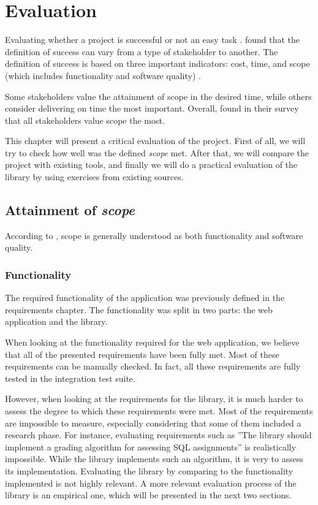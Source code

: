 \chapter{Evaluation}

Evaluating whether a project is successful or not an easy task \citep{lit:definining_success}. \cite{lit:definining_success} found that the definition of success can vary from a type of stakeholder to another. The definition of success is based on three important indicators: cost, time, and scope (which includes functionality and software quality) \citep{lit:definining_success}.

Some stakeholders value the attainment of scope in the desired time, while others consider delivering on time the most important. Overall, \cite{lit:definining_success} found in their survey that all stakeholders value scope the most.

This chapter will present a critical evaluation of the project. First of all, we will try to check how well was the defined \textit{scope} met. After that, we will compare the project with existing tools, and finally we will do a practical evaluation of the library by using exercises from existing sources.

\section{Attainment of \textit{scope}}
According to \cite{lit:definining_success}, scope is generally understood as both functionality and software quality.

\subsection{Functionality}

The required functionality of the application was previously defined in the requirements chapter. The functionality was split in two parts: the web application and the library.

When looking at the functionality required for the web application, we believe that all of the presented requirements have been fully met. Most of these requirements can be manually checked. In fact, all these requirements are fully tested in the integration test suite.

However, when looking at the requirements for the library, it is much harder to assess the degree to which these requirements were met. Most of the requirements are impossible to measure, especially considering that some of them included a research phase. For instance, evaluating requirements such as ''The library should implement a grading algorithm for assessing SQL assignments'' is realistically impossible. While the library implements such an algorithm, it is very to assess its implementation. Evaluating the library by comparing to the functionality implemented is not highly relevant. A more relevant evaluation process of the library is an empirical one, which will be presented in the next two sections.

